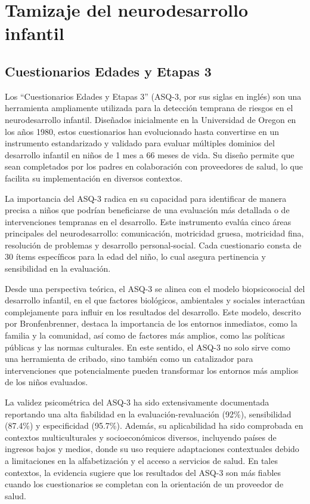 \documentclass[11pt,letterpaper]{report}
\begin{document}
\section{Tamizaje del neurodesarrollo infantil}
\subsection{Cuestionarios Edades y Etapas 3}
Los ``Cuestionarios Edades y Etapas 3'' (ASQ-3, por sus siglas en inglés) son
una herramienta ampliamente utilizada para la detección temprana de riesgos en
el neurodesarrollo infantil. Diseñados inicialmente en la Universidad de Oregon
en los años 1980, estos cuestionarios han evolucionado hasta convertirse en un
instrumento estandarizado y validado para evaluar múltiples dominios del
desarrollo infantil en niños de 1 mes a 66 meses de vida. Su diseño permite que
sean completados por los padres en colaboración con proveedores de salud, lo
que facilita su implementación en diversos contextos.
\cite{Singh2017, ASQ4decades}

La importancia del ASQ-3 radica en su capacidad para identificar de manera
precisa a niños que podrían beneficiarse de una evaluación más detallada o de
intervenciones tempranas en el desarrollo. Este instrumento evalúa cinco áreas
principales del neurodesarrollo: comunicación, motricidad gruesa, motricidad
fina, resolución de problemas y desarrollo personal-social. Cada cuestionario
consta de 30 ítems específicos para la edad del niño, lo cual asegura
pertinencia y sensibilidad en la evaluación. \cite{squires2009ages}

Desde una perspectiva teórica, el ASQ-3 se alinea con el modelo
biopsicosocial del desarrollo infantil, en el que factores biológicos,
ambientales y sociales interactúan complejamente para influir en los
resultados del desarrollo. Este modelo, descrito por Bronfenbrenner, destaca la
importancia de los entornos inmediatos, como la familia y la comunidad, así
como de factores más amplios, como las políticas públicas y las normas
culturales. En este sentido, el ASQ-3 no solo sirve como una herramienta de
cribado, sino también como un catalizador para intervenciones que
potencialmente pueden transformar los entornos más amplios de los niños
evaluados. \cite{Feldman3, Bronfenbrenner2005}

La validez psicométrica del ASQ-3 ha sido extensivamente documentada reportando
una alta fiabilidad en la evaluación-revaluación (92\%), sensibilidad (87.4\%)
y especificidad (95.7\%). Además, su aplicabilidad ha sido comprobada en
contextos multiculturales y socioeconómicos diversos, incluyendo países de
ingresos bajos y medios, donde su uso requiere adaptaciones contextuales debido
a limitaciones en la alfabetización y el acceso a servicios de salud. En tales
contextos, la evidencia sugiere que los resultados del ASQ-3 son más fiables
cuando los cuestionarios se completan con la orientación de un proveedor de
salud. \cite{Vameghi2013-uo, SarmientoCampos2010, Manasyan2023}
\end{document}
